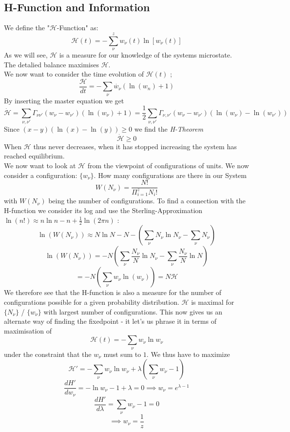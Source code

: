 \documentclass{report}
\begin{document}
\subsection{H-Function and Information}
We define the "$\mathcal{H}$-Function" as:\[
  \mathcal{H}(t) = - \sum_{\nu}^{z} w_\nu\left( t \right) \ln \left[ w_\nu\left( t \right) \right]  
\] 
As we will see, $\mathcal{H}$ is a measure for our knowledge of the systems microstate.\\
The detalied balance maximises $\mathcal{H}$.\\
We now want to consider the time evolution of $\mathcal{H}(t)$ ; \[
  \frac{\mathcal{H}}{dt} = - \sum_{\nu} \dot{w_\nu}\left( \ln(w_n) + 1 \right)  
\] By inserting the master equation we get \[
\dot{\mathcal{H}} = \sum_{\nu, \nu'} \Gamma_{\nu \nu'} \left( w_\nu - w_{\nu'} \right) \left( \ln(w_\nu) + 1 \right) = \frac{1}{2} \sum_{\nu, \nu'} \Gamma_{\nu, \nu'} \left( w_\nu - w_{\nu'} \right) \left( \ln(w_\nu) - \ln(w_{\nu'}) \right)  
\] 
Since $\left( x - y \right) \left( \ln(x) - \ln(y) \right) \ge 0$ we find the \emph{H-Theorem} \[
  \dot{\mathcal{H}} \ge 0
\] 
When $\mathcal{H}$ thus never decreases, when it has stopped increasing the system has reached equilibrium.\\
We now want to look at $\mathcal{H}$ from the viewpoint of configurations of units. We now consider a configuration: $\{w_\nu\}$. How many configurations are there in our System \[
  W\left( N_\nu \right) = \frac{N!}{\Pi_{i=1}^z N_i!}
\] with $W\left( N_\nu \right) $ being the number of configurations. To find a connection with the H-function we consider its log and use the Sterling-Approximation $\ln(n!) \approx n  \ln n - n + \frac{1}{2} \ln\left( 2 \pi n \right) $ :
\[
  \ln\left( W(N_\nu) \right) \approx N \ln N - N -\left( \sum_{\nu} N_\nu \ln N_\nu - \sum_{\nu} N_\nu   \right) 
\] \[
\ln \left( W(N_\nu) \right) = - N (\sum_{\nu} \frac{N_\nu}{N} \ln N_\nu - \sum_{\nu} \frac{N_\nu}{N} \ln N)  
\] \[
= -N \left( \sum_{\nu} w_\nu \ln\left( w_\nu \right)   \right) = N \mathcal{H}
\] 
We therefore see that the H-function is also a measure for the number of configurations possible for a given probability distribution. $\mathcal{H}$ is maximal for $\{N_\nu\}$ / $\{w_\nu\}$ with largest number of configurations. This now gives us an alternate way of finding  the fixedpoint - it let's us phrase it in terms of maximisation of \[
  \mathcal{H}(t) = - \sum_{\nu} w_\nu \ln w_\nu 
\] under the constraint that the $w_\nu$ must sum to $1$. We thus have to maximize \[
\mathcal{H}' = - \sum_{\nu} w_\nu \ln w_\nu + \lambda \left( \sum_{\nu} w_\nu - 1  \right)  
\] \[
\frac{dH'}{dw_\nu} = -\ln w_\nu - 1 + \lambda = 0 \implies w_\nu = e^{\lambda-1}
\] \[
\frac{dH'}{d\lambda} = \sum_{\nu} w_\nu - 1 = 0 
\] \[
\implies w_\nu = \frac{1}{z}
\] 
\end{document}
